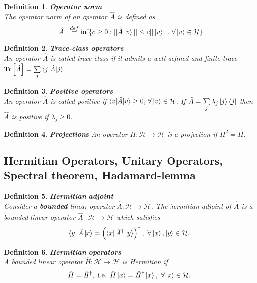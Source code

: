 \documentclass[12pt, a4paper]{article}
\newcommand{\Tr}[1]{\mathrm{Tr}\left[#1\right]}
\newtheorem{definition}{Definition}
\begin{document}
\begin{definition}
    \textbf{Operator norm}\\
    The operator norm of an operator $\hat A$ is defined as 
    \begin{equation*}
        ||\hat A|| \overset{def}{=} \inf\{c\geq 0 : ||\hat A\ket v || \leq c ||\ket v||,\,\forall \ket v \in \mathcal H \}
    \end{equation*}
\end{definition}

\begin{definition}
   \textbf{Trace-class operators}\\
   An operator $\hat A$ is called trace-class if it admits a well defined and finite trace 
   $\Tr{\hat A} = \sum\limits_j\braket{j|\hat A|j}$
\end{definition}

\begin{definition}
    \textbf{Positive operators}\\
    An operator $\hat A$ is called positive if $\braket{v|\hat A|v} \geq 0,\,\forall \ket v \in \mathcal{H}$.
    If $\hat A = \sum\limits_j \lambda_j \ket j \bra j$ then $\hat A$ is positive if $\lambda_j \geq 0$.
\end{definition}

\begin{definition}
    \textbf{Projections}
    An operator $\Pi:\mathcal H \rightarrow \mathcal H$ is a projection if $\Pi^2=\Pi$.
\end{definition}

\subsection{Hermitian Operators, Unitary Operators, Spectral theorem, Hadamard-lemma}
\begin{definition}
    \textbf{Hermitian adjoint}
    \\Consider a \textbf{bounded} linear operator $\hat A: \mathcal H \rightarrow \mathcal H$. The hermitian adjoint of 
    $\hat A$ is a bounded linear operator $\hat A^\dagger : \mathcal H \rightarrow \mathcal H$ which satisfies
    \begin{equation}
        \bra y \hat A \ket x = \left( \bra x \hat A^\dagger \ket y \right)^*, ~\forall \ket x, \ket y \in \mathcal H.
    \end{equation}
\end{definition}

\begin{definition}
    \textbf{Hermitian operators}
    \\ A bounded linear operator $\hat H : \mathcal H\rightarrow \mathcal H$ is Hermitian if 
    \begin{equation}
        \hat H = \hat H^\dagger, \textrm{ i.e. } \hat H\ket x = \hat H^\dagger \ket x, ~\forall \ket x \in \mathcal H.
    \end{equation}
\end{definition}
\end{document}
